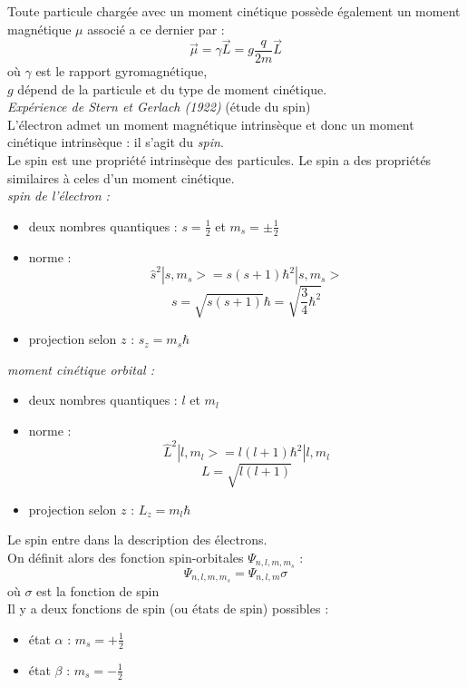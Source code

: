 \documentclass[../main.tex]{subfile}
\begin{document}
 Toute particule chargée avec un moment cinétique possède également un moment magnétique $\mu$ associé a ce dernier par :
 $$\vec{\mu} = \gamma \vec{L} = g \frac{q}{2m} \vec{L}$$
 où $\gamma$ est le rapport gyromagnétique,\\
 $g$ dépend de la particule et du type de moment cinétique.\\


 \emph{Expérience de Stern et Gerlach (1922)} (étude du spin)\\

 L'électron admet un moment magnétique intrinsèque et donc un moment cinétique intrinsèque : il s'agit du \emph{spin}.\\

 Le spin est une propriété intrinsèque des particules. 
 Le spin a des propriétés similaires à celes d'un moment cinétique.\\

 \emph{spin de l'électron :}\\
\begin{itemize} 
         \item deux nombres quantiques : $s=\frac{1}{2}$ et $m_s = \pm\frac{1}{2}$

         \item norme : 
            $$\hat{s}^2 | s, m_s> = s(s+1) \hbar^2 | s, m_s>$$
            $$s = \sqrt{s(s+1)}\hbar = \sqrt{\frac{3}{4} \hbar^2}$$

         \item projection selon $z$ : $s_z = m_s \hbar$\\
\end{itemize}

 \emph{moment cinétique orbital :}\\
\begin{itemize} 
         \item deux nombres quantiques : $l$ et $m_l$

         \item norme : 
            $$\hat{L}^2 | l,m_l> = l(l+1) \hbar^2 | l,m_l$$
            $$L = \sqrt{l(l+1)}$$

         \item projection selon $z$ : $L_z = m_l \hbar$
\end{itemize}

Le spin entre dans la description des électrons.\\
On définit alors des fonction spin-orbitales $\Psi_{n,l,m,m_s}$ :\\
$$\Psi_{n,l,m,m_s} = \Psi_{n,l,m} \sigma$$
où $\sigma$ est la fonction de spin\\

Il y a deux fonctions de spin (ou états de spin) possibles :\\
\begin{itemize}
         \item état $\alpha$ : $m_s = +\frac{1}{2}$
         \item état $\beta$ : $m_s = -\frac{1}{2}$
\end{itemize}
\end{document}
